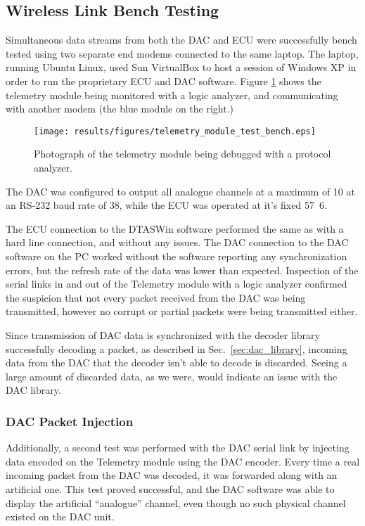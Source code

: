 \subsection{Wireless Link Bench Testing}

Simultaneous data streams from both the DAC and ECU were successfully bench tested using two separate end modems connected to the same laptop. The laptop, running Ubuntu Linux, used Sun VirtualBox to host a session of Windows XP in order to run the proprietary ECU and DAC software. Figure \ref{fig:telemetry_bench_test} shows the telemetry module being monitored with a logic analyzer, and communicating with another modem (the blue module on the right.)

\begin{figure}[H]
 \centering
 \texttt{[image: results/figures/telemetry\_module\_test\_bench.eps]}
 \caption{Photograph of the telemetry module being debugged with a protocol analyzer.}
 \label{fig:telemetry_bench_test}
\end{figure}

The DAC was configured to output all analogue channels at a maximum of \unit{10}{\hertz} at an RS-232 baud rate of \unit{38}{\kilo\bit\per\second}, while the ECU was operated at it's fixed \unit{57.6}{\kilo\bit\per\second}.

The ECU connection to the DTASWin software performed the same as with a hard line connection, and without any issues. The DAC connection to the DAC software on the PC worked without the software reporting any synchronization errors, but the refresh rate of the data was lower than expected. Inspection of the serial links in and out of the Telemetry module with a logic analyzer confirmed the suspicion that not every packet received from the DAC was being transmitted, however no corrupt or partial packets were being transmitted either.

Since transmission of DAC data is synchronized with the decoder library successfully decoding a packet, as described in Sec.\ \ref{sec:dac_library}, incoming data from the DAC that the decoder isn't able to decode is discarded. Seeing a large amount of discarded data, as we were, would indicate an issue with the DAC library.

\subsubsection{DAC Packet Injection}

Additionally, a second test was performed with the DAC serial link by injecting data encoded on the Telemetry module using the DAC encoder. Every time a real incoming packet from the DAC was decoded, it was forwarded along with an artificial one. This test proved successful, and the DAC software was able to display the artificial ``analogue'' channel, even though no such physical channel existed on the DAC unit.